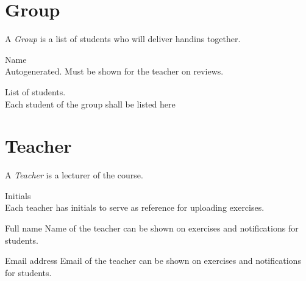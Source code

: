 \documentclass[Main]{subfiles}
\begin{document}

\section{Group}
A \textit{Group} is a list of students who will deliver handins together.
\begin{DataIntro}
\rExample{}
\end{DataIntro}

\newpage
\begin{DataTable}

\Record
{Name\\
Autogenerated. Must be shown for the teacher on reviews.}
{}
{}


\Record
{List of students.\\
Each student of the group shall be listed here}
{}
{}


\end{DataTable}





\section{Teacher}
A \textit{Teacher} is a lecturer of the course.

\begin{DataIntro}
\rExample{}
\end{DataIntro}

\begin{DataTable}

\Record
{Initials\\
Each teacher has initials to serve as reference for uploading exercises.}
{}
{}

\Record
{Full name}
{Name of the teacher can be shown on exercises and notifications for students.}
{}

\Record
{Email address}
{Email of the teacher can be shown on exercises and notifications for students.}
{}

\end{DataTable}
\end{document}
